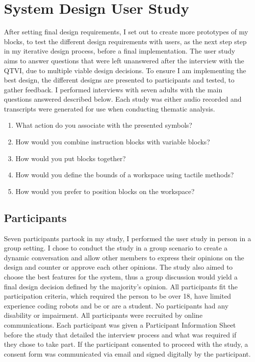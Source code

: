 \documentclass[oneside,%
                    author={Malak Hajji},
                    degree={BSc},
                    title={Designing An Accessible Computational Toolkit For Students},
                  subtitle={With Mixed Visual Abilities}]{dissertation}
\begin{document}
\section{System Design User Study}
After setting final design requirements, I set out to create more prototypes of my blocks, to test the different design requirements with users, as the next step step in my iterative design process, before a final implementation. 
The user study aims to answer questions that were left unanswered after the interview with the QTVI, due to multiple viable design decisions.
To ensure I am implementing the best design, the different designs are presented to participants and tested, to gather feedback.  I performed interviews with seven adults with the main questions answered described below. Each study was either audio recorded and transcripts were generated for use when conducting thematic analysis.

\begin{enumerate}
    \item What action do you associate with the presented symbols?
    \item How would you combine instruction blocks with variable blocks?
    \item How would you put blocks together?
    \item How would you define the bounds of a workspace using tactile methods?
    \item How would you prefer to position blocks on the workspace?
    
\end{enumerate}
\subsection{Participants}

Seven participants partook in my study, I performed the user study in person in a group setting. I chose to conduct the study in a group scenario to create a dynamic conversation and allow other members to express their opinions on the design and counter or approve each other opinions. The study also aimed to choose the best features for the system, thus a group discussion would yield a final design decision defined by the majority's opinion.  All participants fit the participation criteria, which required the person to be over 18, have limited experience coding robots and be or are a student. No participants had any disability or impairment.
All participants were recruited by online communications. Each participant was given a Participant Information Sheet before the study that detailed the interview process and what was required if they chose to take part. If the participant consented to proceed with the study, a consent form was communicated via email and signed digitally by the participant. 
\end{document}
